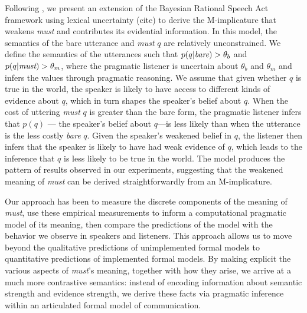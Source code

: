 \documentclass[11pt]{article}
\newcommand{\red}[1]{\textcolor{Red}{#1}}
\begin{document}
Following , we present an extension of the Bayesian Rational Speech Act framework  using lexical uncertainty (cite) to derive the M-implicature that weakens \emph{must} and contributes its evidential information. In this model,  the semantics of the bare utterance and \emph{must} $q$ are relatively unconstrained. We define the semantics of the utterances such that $p(q | \emph{bare} ) > \theta_b$ and $p(q | \emph{must} ) > \theta_m$, where the pragmatic listener is uncertain about $\theta_b$ and $\theta_m$ and infers the values through pragmatic reasoning. We assume that given whether $q$ is true in the world, the speaker is likely to have access to different kinds of evidence about $q$, which in turn shapes the speaker's belief about $q$. When the cost of uttering \emph{must} $q$ is greater than the bare form, the pragmatic listener infers that $p(q)$ --- the speaker's belief about $q$---is less likely than when the utterance is the less costly \emph{bare} $q$.
Given the speaker's weakened belief in $q$, the listener then infers that the speaker is likely to have had weak evidence of $q$, which leads to the inference that $q$ is less likely to be true in the world. The model produces the pattern of results observed in our experiments, suggesting that the weakened meaning of \emph{must} can be derived straightforwardly from an M-implicature.


Our approach has been to measure the discrete components of the meaning of \emph{must}, use these empirical measurements to inform a computational pragmatic model of its meaning, then compare the predictions of the model with the behavior we observe in speakers and listeners. This approach allows us to move beyond the qualitative predictions of unimplemented formal models to quantitative predictions of implemented formal models. By making explicit the various aspects of \emph{must}'s meaning, together with how they arise, we arrive at a much more contrastive semantics: instead of encoding information about semantic strength and evidence strength, we derive these facts via pragmatic inference within an articulated formal model of communication. 




\end{document}
